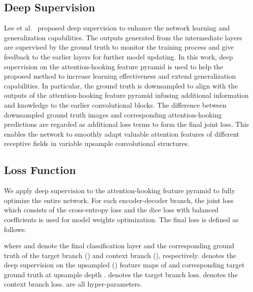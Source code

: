 \documentclass[lettersize,journal,siunitx]{IEEEtran}
\begin{document}
\subsection{Deep Supervision}
Lee et al.~\cite{lee2015deeply} proposed deep supervision to enhance the network learning and generalization capabilities. The outputs generated from the intermediate layers are supervised by the ground truth to monitor the training process and give feedback to the earlier layers for further model updating. In this work, deep supervision on the attention-hooking feature pyramid is used to help the proposed method to increase learning effectiveness and extend generalization capabilities. In particular, the ground truth is downsampled to align with the outputs of the attention-hooking feature pyramid infusing additional information and knowledge to the earlier convolutional blocks. The difference between downsampled ground truth images and corresponding attention-hooking predictions are regarded as additional loss terms to form the final joint loss. This enables the network to smoothly adapt valuable attention features of different receptive fields in variable upsample convolutional structures.

\subsection{Loss Function}
We apply deep supervision to the attention-hooking feature pyramid to fully optimize the entire network. For each encoder-decoder branch, the joint loss which consists of the cross-entropy loss and the dice loss with balanced coefficients is used for model weights optimization. The final loss is defined as follows:




where  and  denote the final classification layer and the corresponding ground truth of the target branch () and context branch (), respectively.  denotes the deep supervision on the upsampled () feature maps of   and corresponding target ground truth  at upsample depth .  denotes the target branch loss.  denotes the context branch loss.  are all hyper-parameters.
\end{document}
